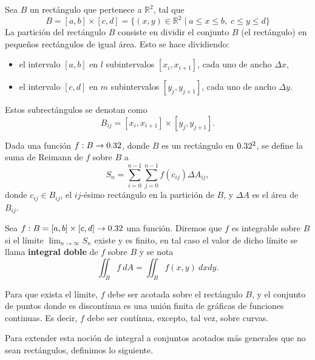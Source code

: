 \begin{definition}
    Sea \( B \) un rectángulo que pertenece a \( \mathbb{R}^2 \), tal que
	\[
	B = [a, b] \times [c, d] = \{(x, y) \in \mathbb{R}^2 \mid a \leq x \leq b, \; c \leq y \leq d\}
	\]
	La partición del rectángulo \( B \) consiste en dividir el conjunto \( B \) (el rectángulo) en pequeños rectángulos de igual área. Esto se hace dividiendo:
	
	\begin{itemize}
		\item el intervalo \( [a, b] \) en \( l \) subintervalos \( [x_i, x_{i+1}] \), cada uno de ancho \( \Delta x \),
		\item el intervalo \( [c, d] \) en \( m \) subintervalos \( [y_j, y_{j+1}] \), cada uno de ancho \( \Delta y \).
	\end{itemize}
	
	Estos subrectángulos se denotan como
	\[
	B_{ij} = [x_i, x_{i+1}] \times [y_j, y_{j+1}].
	\]
\end{definition}


\begin{definition}
Dada una funci\'on $f:B\to0.32$, donde $B$ es un rect\'angulo en $0.32^2$, se define la suma de Reimann de $f$ sobre $B$ a 
\[
    S_n=\sum_{i=0}^{n-1}\sum_{j=0}^{n-1} f(c_{ij})\Delta A_{ij},
\]  
donde $c_{ij}\in B_{ij}$, el $ij$-\'esimo rect\'angulo en la partici\'on de $B$, y $\Delta A$ es el \'area de $B_{ij}$.
\end{definition}

\begin{definition} 
    Sea $f:B=[a,b]\times[c,d]\to0.32$ una funci\'on. Diremos que $f$ es integrable sobre $B$ si  el l\'imite $\lim_{n\to\infty}S_n$  existe y es finito, en tal caso el valor de dicho  l\'imite  se llama \textbf{integral doble} de $f$ sobre $B$ y se nota 
    \[
          \iint_B f\:dA=\iint_B f(x,y)\:dxdy.
    \]
\end{definition}

\begin{obs}
Para que exista el límite, $f$ debe ser acotada sobre el rectángulo $B$, y el conjunto de puntos donde es discontínua es una unión finita de gráficas
de funciones continuas. Es decir, $f$ debe ser contínua, excepto, tal vez, sobre curvas.
\end{obs}


Para extender esta noci\'on de integral a  conjuntos acotados m\'as generales que no sean  rect\'angulos, definimos lo siguiente. 

